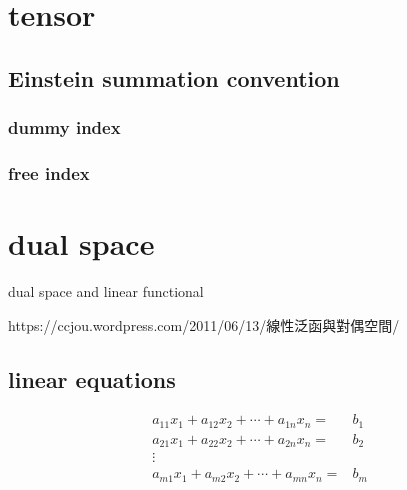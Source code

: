 \documentclass[
]{book}
\theoremstyle{definition}
\theoremstyle{definition}
\theoremstyle{definition}
\theoremstyle{definition}
\theoremstyle{remark}
\begin{document}
\hypertarget{tensor}{%
\chapter{tensor}\label{tensor}}

\hypertarget{einstein-summation-convention}{%
\section{Einstein summation convention}\label{einstein-summation-convention}}

\hypertarget{dummy-index}{%
\subsection{dummy index}\label{dummy-index}}

\hypertarget{free-index}{%
\subsection{free index}\label{free-index}}

\hypertarget{dual-space}{%
\chapter{dual space}\label{dual-space}}

dual space and linear functional

\begin{CJK}{UTF8}{bsmi}
https://ccjou.wordpress.com/2011/06/13/線性泛函與對偶空間/
\end{CJK}

\hypertarget{linear-equations}{%
\section{linear equations}\label{linear-equations}}

\[
\begin{aligned}
a_{{\scriptscriptstyle 11}}x_{{\scriptscriptstyle 1}}+a_{{\scriptscriptstyle 12}}x_{{\scriptscriptstyle 2}}+\cdots+a_{{\scriptscriptstyle 1n}}x_{{\scriptscriptstyle n}}= & b_{{\scriptscriptstyle 1}}\\
a_{{\scriptscriptstyle 21}}x_{{\scriptscriptstyle 1}}+a_{{\scriptscriptstyle 22}}x_{{\scriptscriptstyle 2}}+\cdots+a_{{\scriptscriptstyle 2n}}x_{{\scriptscriptstyle n}}= & b_{{\scriptscriptstyle 2}}\\
\vdots\\
a_{{\scriptscriptstyle m1}}x_{{\scriptscriptstyle 1}}+a_{{\scriptscriptstyle m2}}x_{{\scriptscriptstyle 2}}+\cdots+a_{{\scriptscriptstyle mn}}x_{{\scriptscriptstyle n}}= & b_{{\scriptscriptstyle m}}
\end{aligned}
\]
\end{document}
